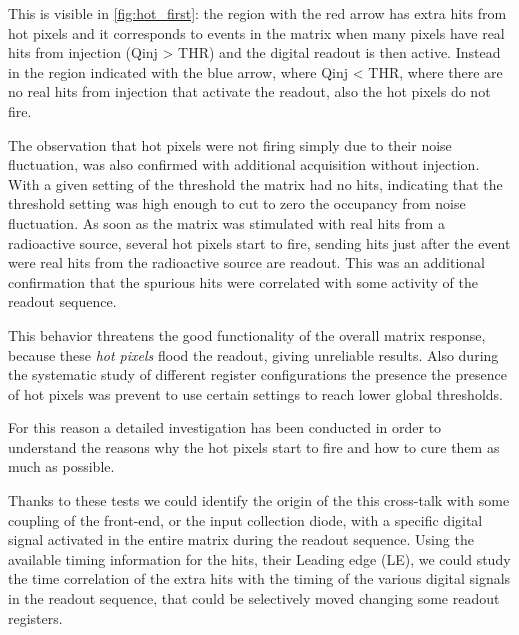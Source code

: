 This is visible in \autoref{fig:hot_first}: the region with the red arrow has extra hits from hot pixels and it corresponds to events in the matrix when many pixels have real hits from injection (Qinj > THR) and the digital readout is then active. Instead in the region indicated with the blue arrow, where Qinj < THR, where there are no real hits from injection that activate the readout, also the hot pixels do not fire.  

The observation that hot pixels were not firing simply due to their noise fluctuation, was also confirmed with additional acquisition without injection. With a given setting of the threshold the matrix had no hits, indicating that the threshold setting was high enough to cut to zero the occupancy from noise fluctuation. As soon as the matrix was stimulated with real hits from a radioactive source, several hot pixels start to fire, sending hits just after the event were real hits from the radioactive source are readout. This was an additional confirmation that the spurious hits were correlated with some activity of the readout sequence. 



This behavior threatens the good functionality of the overall matrix response, because these \textit{hot pixels} flood the readout, giving unreliable results.
Also during the systematic study of different register configurations the presence the presence of hot pixels was prevent to use certain settings to reach lower global thresholds. 

For this reason a detailed investigation has been conducted in order to understand the reasons why the hot pixels start to fire and how to cure them as much as possible. 

Thanks to these tests we could identify the origin of the this cross-talk with some coupling of the front-end,  or the input collection diode, with a specific digital signal activated in the entire matrix during the readout sequence.
Using the available timing information for the hits, their Leading edge (LE),  we could study the time correlation of the extra hits with the timing of the various digital signals in the readout sequence, that could be selectively moved changing some readout registers. 

